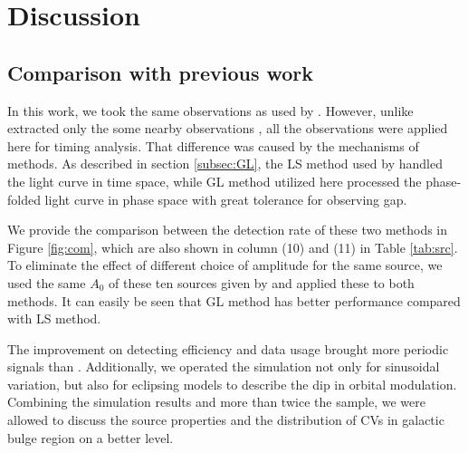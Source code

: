 \documentclass[twoside,twocolumn]{aastex63}
\begin{document}
\section{Discussion}\label{sec:discussion}
\subsection{Comparison with previous work}
In this work, we took the same observations as used by \cite{2012ApJ...746..165H}. However, unlike \cite{2012ApJ...746..165H} extracted only the some nearby observations , all the observations were applied here for timing analysis. That difference was caused by the mechanisms of methods. As described in section \ref{subsec:GL}, the LS method used by \cite{2012ApJ...746..165H} handled the light curve in time space, while GL method utilized here  processed the phase-folded light curve in phase space with great tolerance for observing gap.

 We provide the comparison between the detection rate of these two methods in Figure \ref{fig:com}, which are also shown in column (10) and (11) in Table \ref{tab:src}. To eliminate the effect of different choice of amplitude for the same source, we used the same $A_0$ of these ten sources given by \cite{2012ApJ...746..165H} and applied these to both methods. It can easily be seen that GL method has better performance compared with LS method.

The improvement on detecting efficiency and data usage brought more periodic signals than \cite{2012ApJ...746..165H}. Additionally, we operated the simulation not only for sinusoidal variation, but also for eclipsing models to describe the dip in orbital modulation. Combining the simulation results and more than twice the sample, we were allowed to discuss the source properties and the distribution of CVs in galactic bulge region on a better level.
\end{document}

